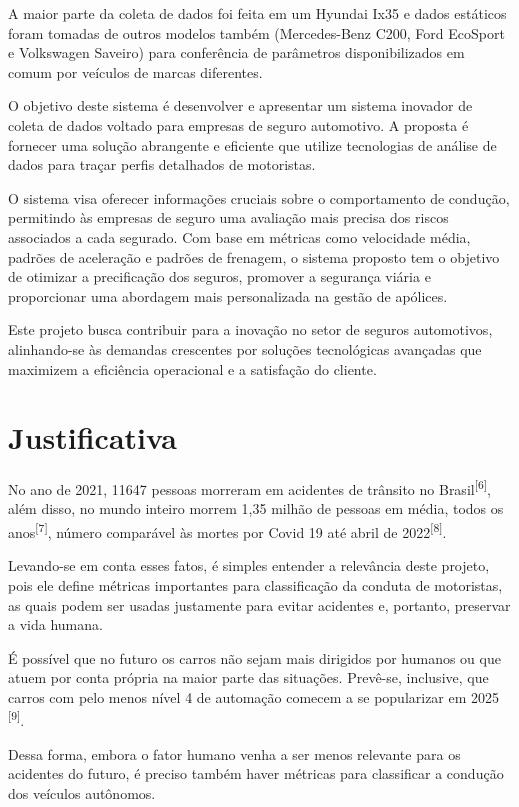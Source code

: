 A maior parte da coleta de dados foi feita em um Hyundai Ix35 e dados estáticos foram tomadas de outros modelos também (Mercedes-Benz C200, Ford EcoSport e Volkswagen Saveiro) para conferência de parâmetros disponibilizados em comum por veículos de marcas diferentes.

O objetivo deste sistema é desenvolver e apresentar um sistema inovador de coleta de dados voltado para empresas de seguro automotivo. A proposta é fornecer uma solução abrangente e eficiente que utilize tecnologias de análise de dados para traçar perfis detalhados de motoristas. 

O sistema visa oferecer informações cruciais sobre o comportamento de condução, permitindo às empresas de seguro uma avaliação mais precisa dos riscos associados a cada segurado. Com base em métricas como velocidade média, padrões de aceleração e padrões  de frenagem, o sistema proposto tem o objetivo de otimizar a precificação dos seguros, promover a segurança viária e proporcionar uma abordagem mais personalizada na gestão de apólices. 

Este projeto busca contribuir para a inovação no setor de seguros automotivos, alinhando-se às demandas crescentes por soluções tecnológicas avançadas que maximizem a eficiência operacional e a satisfação do cliente.

 
\section{Justificativa}
No ano de 2021, 11647 pessoas morreram em acidentes de trânsito no Brasil\textsuperscript{[6]}, além disso, no mundo inteiro morrem 1,35 milhão de pessoas em média, todos os anos\textsuperscript{[7]}, número comparável às mortes por Covid 19 até abril de 2022\textsuperscript{[8]}.

Levando-se em conta esses fatos, é simples entender a relevância deste projeto, pois ele define métricas importantes para classificação da conduta de motoristas, as quais podem ser usadas justamente para evitar acidentes e, portanto, preservar a vida humana.

É possível que no futuro os carros não sejam mais dirigidos por humanos ou que atuem por conta própria na maior parte das situações. Prevê-se, inclusive, que carros com pelo menos nível 4 de automação comecem a se popularizar em 2025 \textsuperscript{[9]}.

Dessa forma, embora o fator humano venha a ser menos relevante para os acidentes do futuro, é preciso também haver métricas para classificar a condução dos veículos autônomos.


